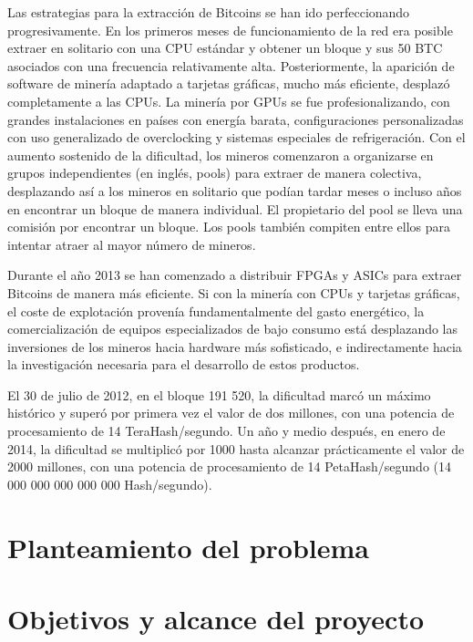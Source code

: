 Las estrategias para la extracci\'on de Bitcoins se han ido perfeccionando progresivamente. En los primeros meses de funcionamiento de la red era posible extraer en solitario con una CPU est\'andar y obtener un bloque y sus 50 BTC asociados con una frecuencia relativamente alta. Posteriormente, la aparici\'on de software de miner\'ia adaptado a tarjetas gr\'aficas, mucho m\'as eficiente, desplaz\'o completamente a las CPUs. La miner\'ia por GPUs se fue profesionalizando, con grandes instalaciones en pa\'ises con energ\'ia barata, configuraciones personalizadas con uso generalizado de overclocking y sistemas especiales de refrigeraci\'on. Con el aumento sostenido de la dificultad, los mineros comenzaron a organizarse en grupos independientes (en ingl\'es, pools) para extraer de manera colectiva, desplazando as\'i a los mineros en solitario que pod\'ian tardar meses o incluso años en encontrar un bloque de manera individual. El propietario del pool se lleva una comisi\'on por encontrar un bloque. Los pools tambi\'en compiten entre ellos para intentar atraer al mayor n\'umero de mineros.

Durante el año 2013 se han comenzado a distribuir FPGAs y ASICs para extraer Bitcoins de manera m\'as eficiente. Si con la miner\'ia con CPUs y tarjetas gr\'aficas, el coste de explotaci\'on proven\'ia fundamentalmente del gasto energ\'etico, la comercializaci\'on de equipos especializados de bajo consumo est\'a desplazando las inversiones de los mineros hacia hardware m\'as sofisticado, e indirectamente hacia la investigaci\'on necesaria para el desarrollo de estos productos.

El 30 de julio de 2012, en el bloque 191 520, la dificultad marc\'o un m\'aximo hist\'orico y super\'o por primera vez el valor de dos millones, con una potencia de procesamiento de 14 TeraHash/segundo. Un año y medio despu\'es, en enero de 2014, la dificultad se multiplic\'o por 1000 hasta alcanzar pr\'acticamente el valor de 2000 millones, con una potencia de procesamiento de 14 PetaHash/segundo  (14 000 000 000 000 000 Hash/segundo).


\section{Planteamiento del problema}

\section{Objetivos y alcance del proyecto}

